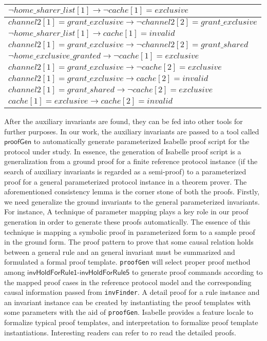 \documentclass{llncs}
\begin{document}
\begin{table}
{\begin{tabular}{|l|}
\hline
$\lnot home\_sharer\_list[1]\longrightarrow \lnot cache[1]=exclusive$ \\
\hline $channel2[1]=grant\_exclusive\longrightarrow \lnot
channel2[2]=grant\_exclusive$ \\ \hline $\lnot
home\_sharer\_list[1]\longrightarrow cache[1]=invalid$ \\ \hline
$channel2[1]=grant\_exclusive\longrightarrow \lnot
channel2[2]=grant\_shared$
\\ \hline
$\lnot home\_exclusive\_granted\longrightarrow \lnot cache[1]=exclusive$ \\
\hline
$channel2[1]=grant\_exclusive\longrightarrow \lnot cache[2]=exclusive$ \\
\hline $channel2[1]=grant\_exclusive\longrightarrow
cache[2]=invalid$ \\ \hline
$channel2[1]=grant\_shared\longrightarrow \lnot cache[2]=exclusive$
\\ \hline $cache[1]=exclusive\longrightarrow cache[2]=invalid$ \\
\hline
\end{tabular}
}
 \end{table}

 After the auxiliary invariants are found, they can be fed into other
tools for further purposes. In our work, the auxiliary invariants
are passed to a tool called $\mathsf{proofGen}$ to automatically
generate parameterized Isabelle proof script for the protocol under
study. In essence, the generation of Isabelle proof script is a
generalization from a ground proof for a finite reference protocol
instance (if the search of auxiliary invariants is regarded as a
semi-proof) to a parameterized proof for a general parameterized
protocol instance in a theorem prover. The aforementioned
consistency lemma is the corner stone of both the proofs. Firstly,
we need generalize the ground invariants to the general
parameterized invariants. For instance,
 A technique of parameter mapping plays a key role in our proof generation in order to
generate these proofs automatically. The essence of this technique
is mapping a symbolic proof in parameterized form to a sample proof
in the ground form. The proof pattern to prove that some causal
relation holds between a general rule and an general invariant must
be summarized and formulated a formal proof template.
\texttt{proofGen} will select proper proof method among
$\mathsf{invHoldForRule1}$-$\mathsf{invHoldForRule5}$ to generate
proof commands according to the mapped proof cases in the reference
protocol model and the corresponding causal information passed from
\texttt{invFinder}.  A detail proof for a rule instance and an
invariant instance can be created by instantiating the proof
templates with some parameters with the aid of \texttt{proofGen}.
Isabelle provides a feature {\sf locale} to formalize typical proof
templates, and {\sf interpretation} to formalize proof template
instantiations. Interesting readers can refer to \cite{} ro read the
detailed proofs.
\end{document}
